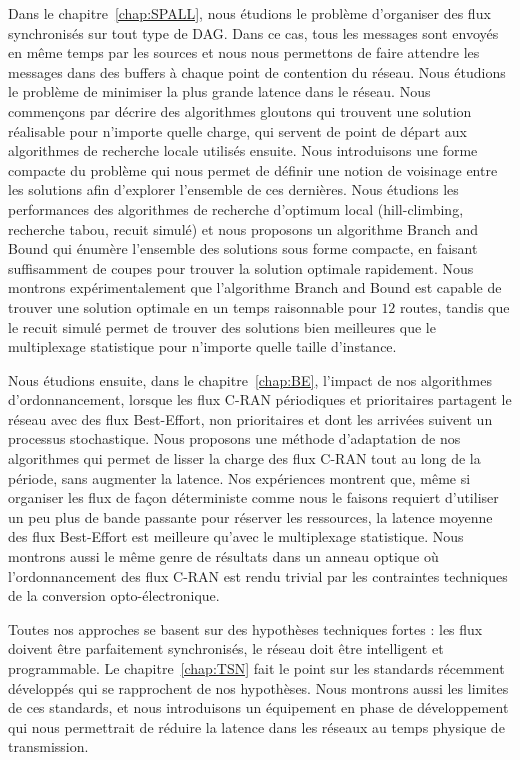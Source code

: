Dans le chapitre~\ref{chap:SPALL}, nous étudions le problème d'organiser des flux synchronisés sur tout type de DAG. Dans ce cas, tous les messages sont envoyés en même temps par les sources et nous nous permettons de faire attendre les messages dans des buffers à chaque point de contention du réseau. Nous étudions le problème de minimiser la plus grande latence dans le réseau. Nous commençons par décrire des algorithmes gloutons qui trouvent une solution réalisable pour n'importe quelle charge, qui servent de point de départ aux algorithmes de recherche locale utilisés ensuite. Nous introduisons une forme compacte du problème qui nous permet de définir une notion de voisinage entre les solutions afin d'explorer l'ensemble de ces dernières. Nous étudions les performances des algorithmes de recherche d'optimum local (hill-climbing, recherche tabou, recuit simulé) et nous proposons un algorithme Branch and Bound qui énumère l'ensemble des solutions sous forme compacte, en faisant suffisamment de coupes pour trouver la solution optimale rapidement. Nous montrons expérimentalement que l'algorithme Branch and Bound est capable de trouver une solution optimale en un temps raisonnable pour $12$ routes, tandis que le recuit simulé permet de trouver des solutions bien meilleures que le multiplexage statistique pour n'importe quelle taille d'instance.

Nous étudions ensuite, dans le chapitre~\ref{chap:BE}, l'impact de nos algorithmes d'ordonnancement, lorsque les flux C-RAN périodiques et prioritaires partagent le réseau avec des flux Best-Effort, non prioritaires et dont les arrivées suivent un processus stochastique. Nous proposons une méthode d'adaptation de nos algorithmes qui permet de lisser la charge des flux C-RAN tout au long de la période, sans augmenter la latence. Nos expériences montrent que, même si organiser les flux de façon déterministe comme nous le faisons requiert d'utiliser un peu plus de bande passante pour réserver les ressources, la latence moyenne des flux Best-Effort est meilleure qu'avec le multiplexage statistique. Nous montrons aussi le même genre de résultats dans un anneau optique où l'ordonnancement des flux C-RAN est rendu trivial par les contraintes techniques de la conversion opto-électronique.

Toutes nos approches se basent sur des hypothèses techniques fortes : les flux doivent être parfaitement synchronisés, le réseau doit être intelligent et programmable. Le chapitre~\ref{chap:TSN} fait le point sur les standards récemment développés qui se rapprochent de nos hypothèses. Nous montrons aussi les limites de ces standards, et nous introduisons un équipement en phase de développement qui nous permettrait de réduire la latence dans les réseaux au temps physique de transmission.



